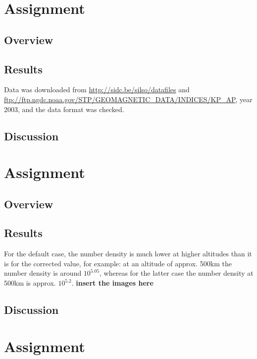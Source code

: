 \section{Assignment}
\subsection{Overview}

\subsection{Results}

Data was downloaded from \url{http://sidc.be/silso/datafiles} and \url{ftp://ftp.ngdc.noaa.gov/STP/GEOMAGNETIC_DATA/INDICES/KP_AP}, year 2003, and the data format was checked.
\subsection{Discussion}




\section{Assignment}
\subsection{Overview}
\subsection{Results}
For the default case, the number density is much lower at higher altitudes than it is for the corrected value, for example: at an altitude of approx. 500km the number density is around $10^{5.05}$, whereas for the latter case the number density at 500km is approx. $10^{5.2}$.
\textbf{insert the images here}
\subsection{Discussion}





\section{Assignment}
